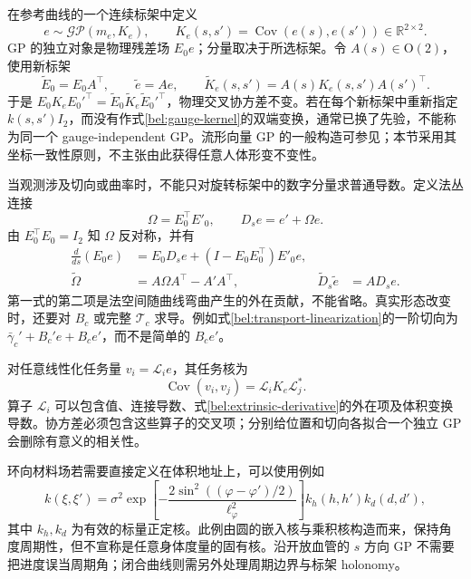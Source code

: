 \documentclass[11pt,a4paper]{article}
\numberwithin{equation}{section}
\theoremstyle{definition}
\DeclareMathOperator{\Cov}{Cov}
\newcommand{\R}{\mathbb R}
\begin{document}
在参考曲线的一个连续标架中定义
\begin{equation}
 e\sim\mathcal{GP}(m_e,K_e),\qquad
 K_e(s,s')=\Cov(e(s),e(s'))\in\R^{2\times2}.
 \label{bel:bundle-gp}
\end{equation}
GP 的独立对象是物理残差场 $E_0e$；分量取决于所选标架。令 $A(s)\in\mathrm O(2)$，使用新标架
\begin{equation}
 \widetilde E_0=E_0A^\top,\qquad
 \widetilde e=Ae,
 \qquad
 \widetilde K_e(s,s')=A(s)K_e(s,s')A(s')^\top.
 \label{bel:gauge-kernel}
\end{equation}
于是 $E_0K_eE_0'^\top=\widetilde E_0\widetilde K_e\widetilde E_0'^\top$，物理交叉协方差不变。若在每个新标架中重新指定 $k(s,s')I_2$，而没有作式\eqref{bel:gauge-kernel}的双端变换，通常已换了先验，不能称为同一个 gauge-independent GP。流形向量 GP 的一般构造可参见\cite{hutchinson2021}；本节采用其坐标一致性原则，不主张由此获得任意人体形变不变性。

当观测涉及切向或曲率时，不能只对旋转标架中的数字分量求普通导数。定义法丛连接
\begin{equation}
 \Omega=E_0^\top E'_0,\qquad
 D_se=e'+\Omega e.
 \label{bel:connection}
\end{equation}
由 $E_0^\top E_0=I_2$ 知 $\Omega$ 反对称，并有
\begin{align}
 \frac{d}{ds}(E_0e)
 &=E_0D_se+(I-E_0E_0^\top)E'_0e,\\
 \widetilde\Omega
 &=A\Omega A^\top-A'A^\top,
 &\widetilde D_s\widetilde e&=A D_se.
 \label{bel:extrinsic-derivative}
\end{align}
第一式的第二项是法空间随曲线弯曲产生的外在贡献，不能省略。真实形态改变时，还要对 $B_c$ 或完整 $\mathcal T_c$ 求导。例如式\eqref{bel:transport-linearization}的一阶切向为
$\bar\gamma_c'+B_c'e+B_ce'$，而不是简单的 $B_ce'$。

对任意线性化任务量 $v_i=\mathcal L_i e$，其任务核为
\begin{equation}
 \Cov(v_i,v_j)=\mathcal L_i K_e\mathcal L_j^*.
 \label{bel:task-kernel}
\end{equation}
算子 $\mathcal L_i$ 可以包含值、连接导数、式\eqref{bel:extrinsic-derivative}的外在项及体积变换导数。协方差必须包含这些算子的交叉项；分别给位置和切向各拟合一个独立 GP 会删除有意义的相关性。

环向材料场若需要直接定义在体积地址上，可以使用例如
\begin{equation}
 k(\xi,\xi')=\sigma^2
 \exp\!\left[-\frac{2\sin^2((\varphi-\varphi')/2)}{\ell_\varphi^2}\right]
 k_h(h,h')k_d(d,d'),
 \label{bel:periodic-kernel}
\end{equation}
其中 $k_h,k_d$ 为有效的标量正定核。此例由圆的嵌入核与乘积核构造而来，保持角度周期性，但不宣称是任意身体度量的固有核。沿开放血管的 $s$ 方向 GP 不需要把进度误当周期角；闭合曲线则需另外处理周期边界与标架 holonomy。
\end{document}

